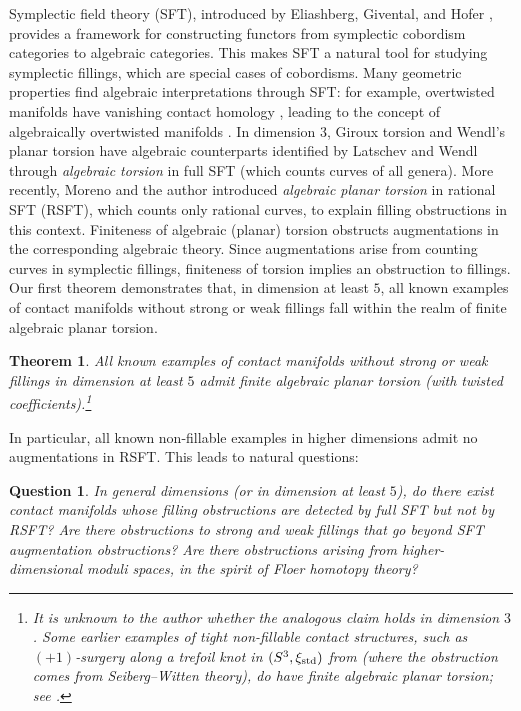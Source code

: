\documentclass[11pt]{amsart}
\numberwithin{equation}{section}
\newtheorem{thmx}{Theorem}
\newtheorem{question}[theorem]{\textbf{Question}}
\def\std{\rm std}
\begin{document}
Symplectic field theory (SFT), introduced by Eliashberg, Givental, and Hofer \cite{zbMATH01643843}, provides a framework for constructing functors from symplectic cobordism categories to algebraic categories. This makes SFT a natural tool for studying symplectic fillings, which are special cases of cobordisms. Many geometric properties find algebraic interpretations through SFT: for example, overtwisted manifolds have vanishing contact homology \cite{zbMATH05709738}, leading to the concept of algebraically overtwisted manifolds \cite{zbMATH05658836}. In dimension $3$, Giroux torsion and Wendl's planar torsion have algebraic counterparts identified by Latschev and Wendl \cite{LW} through \emph{algebraic torsion} in full SFT (which counts curves of all genera). More recently, Moreno and the author \cite{moreno2024landscape} introduced \emph{algebraic planar torsion} in rational SFT (RSFT), which counts only rational curves, to explain filling obstructions in this context. Finiteness of algebraic (planar) torsion obstructs augmentations in the corresponding algebraic theory. Since augmentations arise from counting curves in symplectic fillings, finiteness of torsion implies an obstruction to fillings. Our first theorem demonstrates that, in dimension at least $5$, all known examples of contact manifolds without strong or weak fillings fall within the realm of finite algebraic planar torsion.

\begin{thmx}\label{thm:everything}
    All known examples of contact manifolds without strong or weak fillings in dimension at least $5$ admit finite algebraic planar torsion (with twisted coefficients).\footnote{It is unknown to the author whether the analogous claim holds in dimension $3$. Some earlier examples of tight non-fillable contact structures, such as $(+1)$-surgery along a trefoil knot in $(S^3,\xi_{\std})$ from \cite{zbMATH02105207} (where the obstruction comes from Seiberg--Witten theory), do have finite algebraic planar torsion; see \cite{zbMATH07699409,AOT,zbMATH07983165}.}
\end{thmx}

In particular, all known non-fillable examples in higher dimensions admit no augmentations in RSFT. This leads to natural questions:

\begin{question}
    In general dimensions (or in dimension at least $5$), do there exist contact manifolds whose filling obstructions are detected by full SFT but not by RSFT? Are there obstructions to strong and weak fillings that go beyond SFT augmentation obstructions? Are there obstructions arising from higher-dimensional moduli spaces, in the spirit of Floer homotopy theory?
\end{question}
\end{document}
